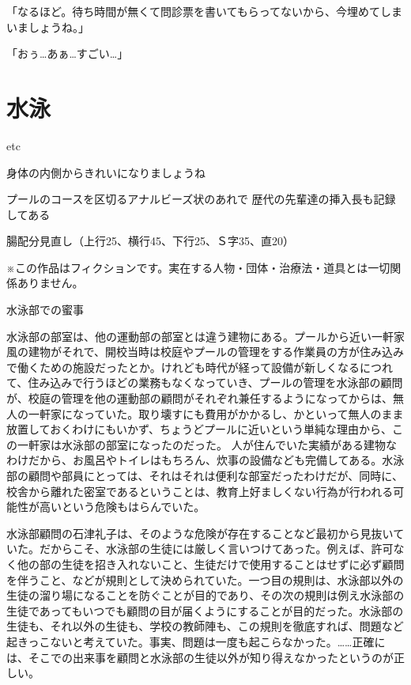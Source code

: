 「なるほど。待ち時間が無くて問診票を書いてもらってないから、今埋めてしまいましょうね。」




「おぅ…あぁ…すごい…」


\section{水泳}
etc

身体の内側からきれいになりましょうね

プールのコースを区切るアナルビーズ状のあれで
歴代の先輩達の挿入長も記録してある

腸配分見直し（上行25、横行45、下行25、Ｓ字35、直20）


※この作品はフィクションです。実在する人物・団体・治療法・道具とは一切関係ありません。

水泳部での蜜事

水泳部の部室は、他の運動部の部室とは違う建物にある。プールから近い一軒家風の建物がそれで、開校当時は校庭やプールの管理をする作業員の方が住み込みで働くための施設だったとか。けれども時代が経って設備が新しくなるにつれて、住み込みで行うほどの業務もなくなっていき、プールの管理を水泳部の顧問が、校庭の管理を他の運動部の顧問がそれぞれ兼任するようになってからは、無人の一軒家になっていた。取り壊すにも費用がかかるし、かといって無人のまま放置しておくわけにもいかず、ちょうどプールに近いという単純な理由から、この一軒家は水泳部の部室になったのだった。
人が住んでいた実績がある建物なわけだから、お風呂やトイレはもちろん、炊事の設備なども完備してある。水泳部の顧問や部員にとっては、それはそれは便利な部室だったわけだが、同時に、校舎から離れた密室であるということは、教育上好ましくない行為が行われる可能性が高いという危険もはらんでいた。

水泳部顧問の石津礼子は、そのような危険が存在することなど最初から見抜いていた。だからこそ、水泳部の生徒には厳しく言いつけてあった。例えば、許可なく他の部の生徒を招き入れないこと、生徒だけで使用することはせずに必ず顧問を伴うこと、などが規則として決められていた。一つ目の規則は、水泳部以外の生徒の溜り場になることを防ぐことが目的であり、その次の規則は例え水泳部の生徒であってもいつでも顧問の目が届くようにすることが目的だった。水泳部の生徒も、それ以外の生徒も、学校の教師陣も、この規則を徹底すれば、問題など起きっこないと考えていた。事実、問題は一度も起こらなかった。……正確には、そこでの出来事を顧問と水泳部の生徒以外が知り得えなかったというのが正しい。

